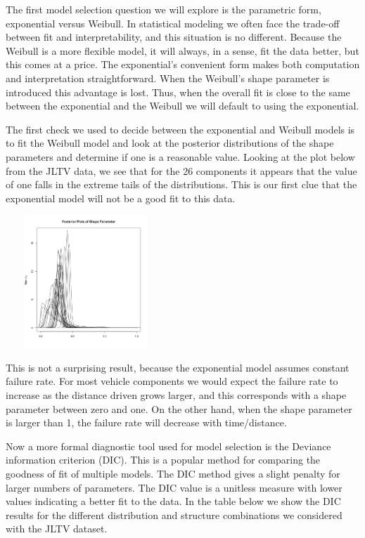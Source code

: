 \documentclass[12pt]{article}
\begin{document}
The first model selection question we will explore is the parametric form,
exponential versus Weibull.  In statistical modeling we often face the
trade-off between fit and interpretability, and this situation is no different.
Because the Weibull is a more flexible model, it will always, in a sense, fit the
data better, but this comes at a price.  The exponential's convenient form
makes both computation and interpretation straightforward.  When the Weibull's
shape parameter is introduced this advantage is lost.  Thus, when the overall
fit is close to the same between the exponential and the Weibull we will
default to using the exponential.

The first check we used to decide between the exponential and Weibull models is
to fit the Weibull model and look at the posterior distributions of the
shape parameters and determine if one is a reasonable value.  Looking at the
plot below from the JLTV data, we see that for the 26 components it appears
that the value of one falls in the extreme tails of the distributions.  This is
our first clue that the exponential model will not be a good fit to this data.

\includegraphics[width=6cm, height=5cm]{betaPostPlot}

This is not a surprising result, because the exponential model assumes constant
failure rate.  For most vehicle components we would expect the failure rate to
increase as the distance driven grows larger, and this corresponds with a shape
parameter between zero and one.  On the other hand, when the shape parameter is
larger than 1, the failure rate will decrease with time/distance.

Now a more formal diagnostic tool used for model selection is the Deviance
information criterion (DIC).  This is a popular method for comparing the
goodness of fit of multiple models.  The DIC method gives a slight penalty for
larger numbers of parameters.  The DIC value is a unitless measure with lower
values indicating a better fit to the data.  In the table below we show the DIC
results for the different distribution and structure combinations we considered
with the JLTV dataset.
\end{document}
